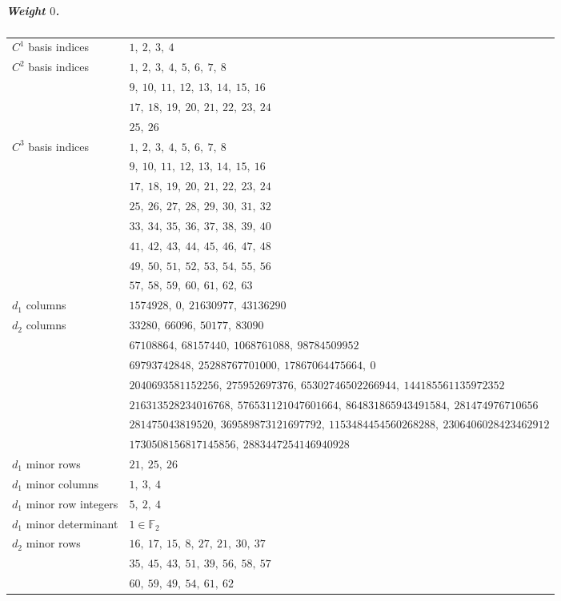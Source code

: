\subparagraph{Weight $0$.}
\begin{longtable}{l l}
\endhead
$C^{1}$ basis indices & $1,\ 2,\ 3,\ 4$\\
$C^{2}$ basis indices & $1,\ 2,\ 3,\ 4,\ 5,\ 6,\ 7,\ 8$\\
 & $9,\ 10,\ 11,\ 12,\ 13,\ 14,\ 15,\ 16$\\
 & $17,\ 18,\ 19,\ 20,\ 21,\ 22,\ 23,\ 24$\\
 & $25,\ 26$\\
$C^{3}$ basis indices & $1,\ 2,\ 3,\ 4,\ 5,\ 6,\ 7,\ 8$\\
 & $9,\ 10,\ 11,\ 12,\ 13,\ 14,\ 15,\ 16$\\
 & $17,\ 18,\ 19,\ 20,\ 21,\ 22,\ 23,\ 24$\\
 & $25,\ 26,\ 27,\ 28,\ 29,\ 30,\ 31,\ 32$\\
 & $33,\ 34,\ 35,\ 36,\ 37,\ 38,\ 39,\ 40$\\
 & $41,\ 42,\ 43,\ 44,\ 45,\ 46,\ 47,\ 48$\\
 & $49,\ 50,\ 51,\ 52,\ 53,\ 54,\ 55,\ 56$\\
 & $57,\ 58,\ 59,\ 60,\ 61,\ 62,\ 63$\\
$d_1$ columns & $1574928,\ 0,\ 21630977,\ 43136290$\\
$d_2$ columns & $33280,\ 66096,\ 50177,\ 83090$\\
 & $67108864,\ 68157440,\ 1068761088,\ 98784509952$\\
 & $69793742848,\ 25288767701000,\ 17867064475664,\ 0$\\
 & $2040693581152256,\ 275952697376,\ 65302746502266944,\ 144185561135972352$\\
 & $216313528234016768,\ 576531121047601664,\ 864831865943491584,\ 281474976710656$\\
 & $281475043819520,\ 369589873121697792,\ 1153484454560268288,\ 2306406028423462912$\\
 & $1730508156817145856,\ 2883447254146940928$\\
$d_1$ minor rows & $21,\ 25,\ 26$\\
$d_1$ minor columns & $1,\ 3,\ 4$\\
$d_1$ minor row integers & $5,\ 2,\ 4$\\
$d_1$ minor determinant & $1\in\mathbb F_2$\\
$d_2$ minor rows & $16,\ 17,\ 15,\ 8,\ 27,\ 21,\ 30,\ 37$\\
 & $35,\ 45,\ 43,\ 51,\ 39,\ 56,\ 58,\ 57$\\
 & $60,\ 59,\ 49,\ 54,\ 61,\ 62$\\

\end{longtable}
